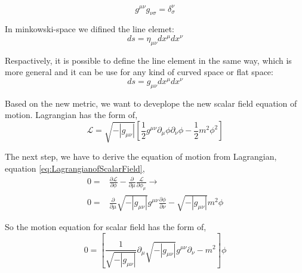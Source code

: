 \begin{equation}
    g^{\mu\nu}g_{\nu\sigma} = \delta^\nu_\sigma
\end{equation}
	
In minkowski-space we difined the line elemet:\\

\begin{equation}
    ds = \eta_{\mu\nu} dx^\mu dx^\nu
\end{equation}

Respactively, it is possible to define the line element in the same way, which is more general and it can be use for any kind of curved space or flat space:\\

\begin{equation}
    ds = g_{\mu\nu} dx^\mu dx^\nu
\end{equation}

Based on the new metric, we want to deveplope the new scalar field equation of motion. Lagrangian has the form of,\\

\begin{equation} \label{eq:LagrangianofScalarField}
    \mathcal{L} = \sqrt{-|g_{\mu\nu}|} \left[ \frac{1}{2}g^{\mu\nu}\partial_\mu\phi\partial_\nu\phi -\frac{1}{2} m^2\phi^2 \right]
\end{equation}

The next step, we have to derive the equation of motion from Lagrangian, equation \ref{eq:LagrangianofScalarField},\\

\begin{align}
    0 =& \frac{\partial\mathcal{L}}{\partial\phi} - \frac{\partial}{\partial\mu}\frac{\mathcal{L}}{\partial\phi_\mu}\rightarrow \nonumber\\
    0 =& \frac{\partial}{\partial\mu} \sqrt{-|g_{\mu\nu}|} g^{\mu\nu} \frac{\partial\phi}{\partial\nu} -\sqrt{-|g_{\mu\nu}|} m^2 \phi 
\end{align}

So the motion equation for scalar field has the form of,\\

\begin{equation} \label{eq:MotionScalarField}
    0 = \left[ \frac{1}{\sqrt{-|g_{\mu\nu}|}} \partial_\mu \sqrt{-|g_{\mu\nu}|} g^{\mu\nu} \partial_\nu - m^2 \right] \phi
\end{equation}

